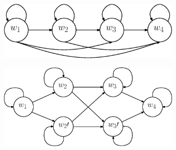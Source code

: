 \documentclass[a4paper, oneside]{csthesis}
\begin{document}
\begin{figure}
        ~ %
        \begin{subfigure}[b]{0.35\textwidth}
                \centering
                \includegraphics[width=\textwidth]{figures/hmm-ltr3.eps}
                \label{fig:hmm1}
        \end{subfigure}%
        \quad
        \begin{subfigure}[b]{0.35\textwidth}
                \centering
                \includegraphics[width=\textwidth]{figures/hmm-ltr5.eps}
                \label{fig:hmm1}
        \end{subfigure}%


\end{figure}
\end{document}

